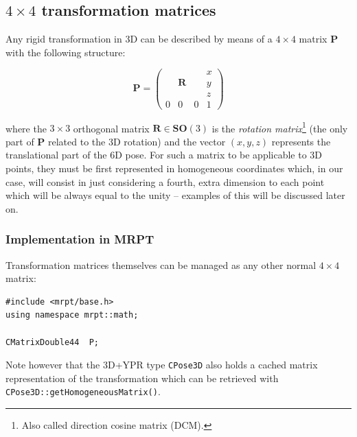 \documentclass[a4paper,11pt]{report}
\begin{document}
%

\subsection{$4 \times 4$ transformation matrices}

Any rigid transformation in 3D can be described by means of a $4 \times 4$ 
matrix $\mathbf{P}$ with the following structure:

\begin{equation}
\mathbf{P}=\left(
  \begin{array}{ccc|c}
   & & & x \\
   & \mathbf{R} & & y \\
   & & & z \\ \hline
   0 & 0 & 0& 1
  \end{array}
\right)
\end{equation}

\noindent where the $3 \times 3$ orthogonal matrix $\mathbf{R} \in \mathbf{SO}(3)$ 
is the \emph{rotation matrix}\footnote{Also called direction cosine matrix (DCM).} 
(the only part of $\mathbf{P}$ related to 
the 3D rotation) and the vector $(x,y,z)$ represents the translational part of the 6D pose. 
For such a matrix to be applicable to 3D points, they must be first represented in 
homogeneous coordinates \cite{bloomenthal1994homogeneous} which, in our case, will consist in just considering a fourth,
extra dimension to each point which will be always equal to the unity -- examples of this will be discussed later on. 


\subsubsection{Implementation in MRPT}

Transformation matrices themselves can be managed as any other normal $4\times 4$ matrix:

\begin{lstlisting}
#include <mrpt/base.h> 
using namespace mrpt::math; 

CMatrixDouble44  P;
\end{lstlisting}

Note however that the 3D+YPR type \texttt{CPose3D} also holds a cached matrix representation 
of the transformation which can be retrieved with \texttt{CPose3D::getHomogeneousMatrix()}.



\end{document}
